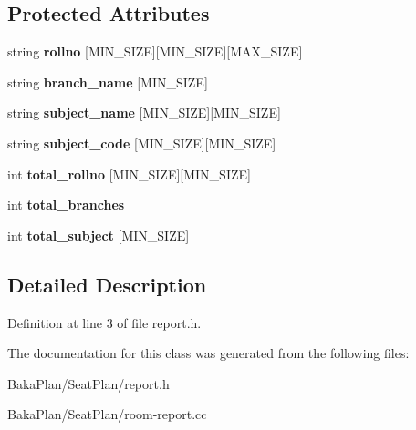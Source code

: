 \subsection*{Protected Attributes}
\begin{DoxyCompactItemize}
\item 
\hypertarget{classRoomReport_af342c8a98e579b420ebde3783ad5f3df}{string {\bfseries rollno} \mbox{[}M\-I\-N\-\_\-\-S\-I\-Z\-E\mbox{]}\mbox{[}M\-I\-N\-\_\-\-S\-I\-Z\-E\mbox{]}\mbox{[}M\-A\-X\-\_\-\-S\-I\-Z\-E\mbox{]}}\label{classRoomReport_af342c8a98e579b420ebde3783ad5f3df}

\item 
\hypertarget{classRoomReport_a2582b819b47038641678e4645f25de34}{string {\bfseries branch\-\_\-name} \mbox{[}M\-I\-N\-\_\-\-S\-I\-Z\-E\mbox{]}}\label{classRoomReport_a2582b819b47038641678e4645f25de34}

\item 
\hypertarget{classRoomReport_a530a885bacdce429ae607b741216d4b5}{string {\bfseries subject\-\_\-name} \mbox{[}M\-I\-N\-\_\-\-S\-I\-Z\-E\mbox{]}\mbox{[}M\-I\-N\-\_\-\-S\-I\-Z\-E\mbox{]}}\label{classRoomReport_a530a885bacdce429ae607b741216d4b5}

\item 
\hypertarget{classRoomReport_a62207caf3dd352107bd2566138a98ae4}{string {\bfseries subject\-\_\-code} \mbox{[}M\-I\-N\-\_\-\-S\-I\-Z\-E\mbox{]}\mbox{[}M\-I\-N\-\_\-\-S\-I\-Z\-E\mbox{]}}\label{classRoomReport_a62207caf3dd352107bd2566138a98ae4}

\item 
\hypertarget{classRoomReport_a099a235828672ee6c31dd163d51e648c}{int {\bfseries total\-\_\-rollno} \mbox{[}M\-I\-N\-\_\-\-S\-I\-Z\-E\mbox{]}\mbox{[}M\-I\-N\-\_\-\-S\-I\-Z\-E\mbox{]}}\label{classRoomReport_a099a235828672ee6c31dd163d51e648c}

\item 
\hypertarget{classRoomReport_a4ce1c0593c6d5053575fcf7975ed1577}{int {\bfseries total\-\_\-branches}}\label{classRoomReport_a4ce1c0593c6d5053575fcf7975ed1577}

\item 
\hypertarget{classRoomReport_ad526976fbeecd9b4ad1888e1b90eb9ee}{int {\bfseries total\-\_\-subject} \mbox{[}M\-I\-N\-\_\-\-S\-I\-Z\-E\mbox{]}}\label{classRoomReport_ad526976fbeecd9b4ad1888e1b90eb9ee}

\end{DoxyCompactItemize}


\subsection{Detailed Description}


Definition at line 3 of file report.\-h.



The documentation for this class was generated from the following files\-:\begin{DoxyCompactItemize}
\item 
Baka\-Plan/\-Seat\-Plan/report.\-h\item 
Baka\-Plan/\-Seat\-Plan/room-\/report.\-cc\end{DoxyCompactItemize}
